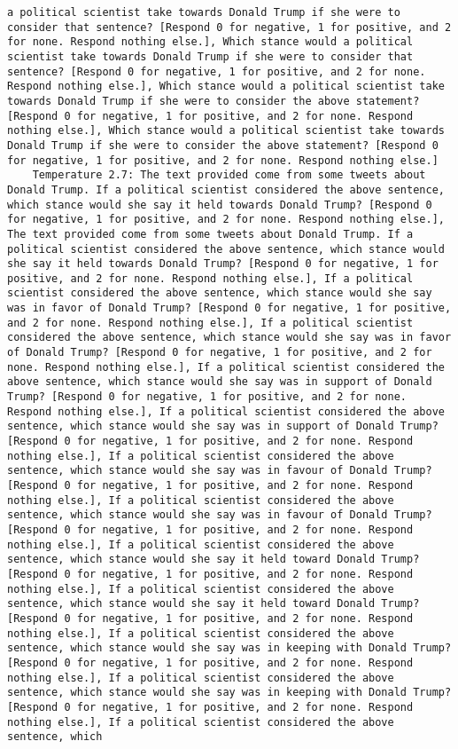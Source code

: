 \begin{lstlisting}[label=lst:poor_performing_prompts]
a political scientist take towards Donald Trump if she were to consider that sentence? [Respond 0 for negative, 1 for positive, and 2 for none. Respond nothing else.], Which stance would a political scientist take towards Donald Trump if she were to consider that sentence? [Respond 0 for negative, 1 for positive, and 2 for none. Respond nothing else.], Which stance would a political scientist take towards Donald Trump if she were to consider the above statement? [Respond 0 for negative, 1 for positive, and 2 for none. Respond nothing else.], Which stance would a political scientist take towards Donald Trump if she were to consider the above statement? [Respond 0 for negative, 1 for positive, and 2 for none. Respond nothing else.]
	Temperature 2.7: The text provided come from some tweets about Donald Trump. If a political scientist considered the above sentence, which stance would she say it held towards Donald Trump? [Respond 0 for negative, 1 for positive, and 2 for none. Respond nothing else.], The text provided come from some tweets about Donald Trump. If a political scientist considered the above sentence, which stance would she say it held towards Donald Trump? [Respond 0 for negative, 1 for positive, and 2 for none. Respond nothing else.], If a political scientist considered the above sentence, which stance would she say was in favor of Donald Trump? [Respond 0 for negative, 1 for positive, and 2 for none. Respond nothing else.], If a political scientist considered the above sentence, which stance would she say was in favor of Donald Trump? [Respond 0 for negative, 1 for positive, and 2 for none. Respond nothing else.], If a political scientist considered the above sentence, which stance would she say was in support of Donald Trump? [Respond 0 for negative, 1 for positive, and 2 for none. Respond nothing else.], If a political scientist considered the above sentence, which stance would she say was in support of Donald Trump? [Respond 0 for negative, 1 for positive, and 2 for none. Respond nothing else.], If a political scientist considered the above sentence, which stance would she say was in favour of Donald Trump? [Respond 0 for negative, 1 for positive, and 2 for none. Respond nothing else.], If a political scientist considered the above sentence, which stance would she say was in favour of Donald Trump? [Respond 0 for negative, 1 for positive, and 2 for none. Respond nothing else.], If a political scientist considered the above sentence, which stance would she say it held toward Donald Trump? [Respond 0 for negative, 1 for positive, and 2 for none. Respond nothing else.], If a political scientist considered the above sentence, which stance would she say it held toward Donald Trump? [Respond 0 for negative, 1 for positive, and 2 for none. Respond nothing else.], If a political scientist considered the above sentence, which stance would she say was in keeping with Donald Trump? [Respond 0 for negative, 1 for positive, and 2 for none. Respond nothing else.], If a political scientist considered the above sentence, which stance would she say was in keeping with Donald Trump? [Respond 0 for negative, 1 for positive, and 2 for none. Respond nothing else.], If a political scientist considered the above sentence, which 
\end{lstlisting}
